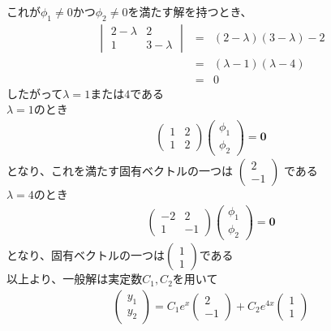 \documentclass[pdflatex,ja=standard,fleqn]{bxjsarticle}
\begin{document}
これが$\phi_{1}\ne0$かつ$\phi_{2}\ne0$を満たす解を持つとき、
\begin{eqnarray*}
    \begin{vmatrix}2-\lambda&2\\1&3-\lambda\end{vmatrix}
    &=&(2-\lambda)(3-\lambda)-2\\
    &=&(\lambda-1)(\lambda-4)\\
    &=&0
\end{eqnarray*}
したがって$\lambda=1$または$4$である\\
$\lambda=1$のとき
\begin{eqnarray*}
    \begin{pmatrix}1&2\\1&2\end{pmatrix}\begin{pmatrix}\phi_{1}\\\phi_{2}\end{pmatrix}=\boldsymbol{0}
\end{eqnarray*}
となり、これを満たす固有ベクトルの一つは
$\begin{pmatrix}2\\-1\end{pmatrix}$
である\\
$\lambda=4$のとき
\begin{eqnarray*}
    \begin{pmatrix}-2&2\\1&-1\end{pmatrix}\begin{pmatrix}\phi_{1}\\\phi_{2}\end{pmatrix}=\boldsymbol{0}
\end{eqnarray*}
となり、固有ベクトルの一つは$\begin{pmatrix}1\\1\end{pmatrix}$である\\
以上より、一般解は実定数$C_{1},C_{2}$を用いて
\begin{eqnarray*}
    \begin{pmatrix}y_{1}\\y_{2}\end{pmatrix}=C_{1}e^{x}\begin{pmatrix}2\\-1\end{pmatrix}+C_{2}e^{4x}\begin{pmatrix}1\\1\end{pmatrix}
\end{eqnarray*}
\end{document}

